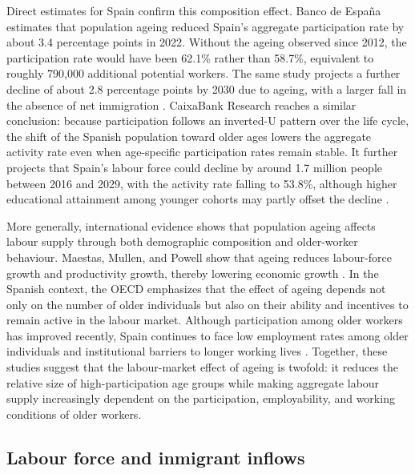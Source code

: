 \vspace{0.7em}\par
Direct estimates for Spain confirm this composition effect. Banco de Espa{\~n}a estimates that population ageing reduced Spain's aggregate participation rate by about 3.4 percentage points in 2022. Without the ageing observed since 2012, the participation rate would have been 62.1\% rather than 58.7\%, equivalent to roughly 790,000 additional potential workers. The same study projects a further decline of about 2.8 percentage points by 2030 due to ageing, with a larger fall in the absence of net immigration \parencite{bde2023ageingParticipation}. CaixaBank Research reaches a similar conclusion: because participation follows an inverted-U pattern over the life cycle, the shift of the Spanish population toward older ages lowers the aggregate activity rate even when age-specific participation rates remain stable. It further projects that Spain's labour force could decline by around 1.7 million people between 2016 and 2029, with the activity rate falling to 53.8\%, although higher educational attainment among younger cohorts may partly offset the decline \parencite{caixabank2017labourForceAgeing}.

\vspace{0.7em}\par
More generally, international evidence shows that population ageing affects labour supply through both demographic composition and older-worker behaviour. Maestas, Mullen, and Powell show that ageing reduces labour-force growth and productivity growth, thereby lowering economic growth \parencite{maestas2023effect}. In the Spanish context, the OECD emphasizes that the effect of ageing depends not only on the number of older individuals but also on their ability and incentives to remain active in the labour market. Although participation among older workers has improved recently, Spain continues to face low employment rates among older individuals and institutional barriers to longer working lives \parencite{oecd2025olderWorkersMigrantsSpain}. Together, these studies suggest that the labour-market effect of ageing is twofold: it reduces the relative size of high-participation age groups while making aggregate labour supply increasingly dependent on the participation, employability, and working conditions of older workers.

\subsection{Labour force and inmigrant inflows}

